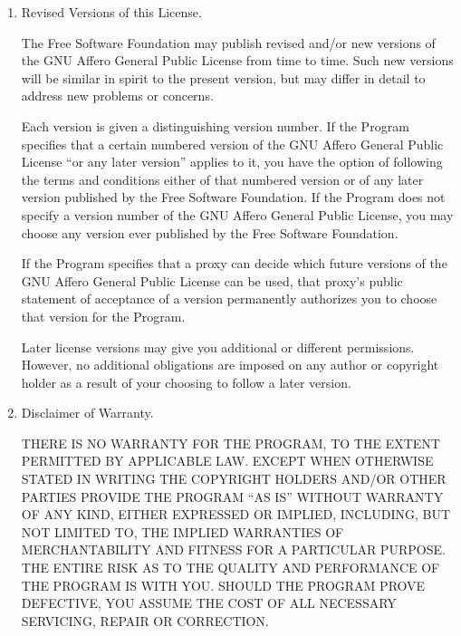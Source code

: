 \documentclass[11pt]{article}
\begin{document}
\begin{enumerate}
Notwithstanding any other provision of this License, you have permission to
link or combine any covered work with a work licensed under version 3 of
the GNU General Public License into a single combined work, and to convey
the resulting work.  The terms of this License will continue to apply to
the part which is the covered work, but the work with which it is combined
will remain governed by version 3 of the GNU General Public License.

\item Revised Versions of this License.

The Free Software Foundation may publish revised and/or new versions of
the GNU Affero General Public License from time to time.  Such new versions will
be similar in spirit to the present version, but may differ in detail to
address new problems or concerns.

Each version is given a distinguishing version number.  If the
Program specifies that a certain numbered version of the GNU Affero General
Public License ``or any later version'' applies to it, you have the
option of following the terms and conditions either of that numbered
version or of any later version published by the Free Software
Foundation.  If the Program does not specify a version number of the
GNU Affero General Public License, you may choose any version ever published
by the Free Software Foundation.

If the Program specifies that a proxy can decide which future
versions of the GNU Affero General Public License can be used, that proxy's
public statement of acceptance of a version permanently authorizes you
to choose that version for the Program.

Later license versions may give you additional or different
permissions.  However, no additional obligations are imposed on any
author or copyright holder as a result of your choosing to follow a
later version.

\item Disclaimer of Warranty.

\begin{sloppypar}
 THERE IS NO WARRANTY FOR THE PROGRAM, TO THE EXTENT PERMITTED BY
 APPLICABLE LAW.  EXCEPT WHEN OTHERWISE STATED IN WRITING THE
 COPYRIGHT HOLDERS AND/OR OTHER PARTIES PROVIDE THE PROGRAM ``AS IS''
 WITHOUT WARRANTY OF ANY KIND, EITHER EXPRESSED OR IMPLIED,
 INCLUDING, BUT NOT LIMITED TO, THE IMPLIED WARRANTIES OF
 MERCHANTABILITY AND FITNESS FOR A PARTICULAR PURPOSE.  THE ENTIRE
 RISK AS TO THE QUALITY AND PERFORMANCE OF THE PROGRAM IS WITH YOU.
 SHOULD THE PROGRAM PROVE DEFECTIVE, YOU ASSUME THE COST OF ALL
 NECESSARY SERVICING, REPAIR OR CORRECTION.
\end{sloppypar}


\end{enumerate}
\end{document}
